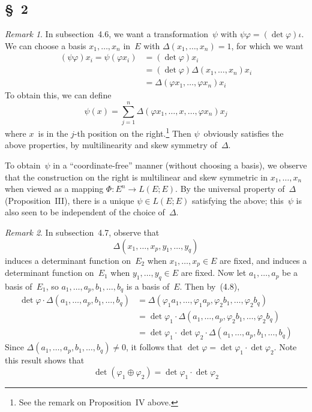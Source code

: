 \documentclass[letterpaper,12pt]{article}
\newcommand{\dsum}{\oplus}
\newcommand{\mult}{\cdot}
\theoremstyle{definition}
\theoremstyle{remark}
\newtheorem*{rmk}{Remark}
\begin{document}
\subsection*{\S~2}
\begin{rmk}
In subsection~4.6, we want a transformation~\(\psi\) with \(\psi\varphi=(\det\varphi)\iota\). We can choose a basis \(x_1,\ldots,x_n\) in~\(E\) with \(\Delta(x_1,\ldots,x_n)=1\), for which we want
\begin{align*}
(\psi\varphi)x_i=\psi(\varphi x_i)&=(\det\varphi)x_i\\
	&=(\det\varphi)\Delta(x_1,\ldots,x_n)x_i\\
	&=\Delta(\varphi x_1,\ldots,\varphi x_n)x_i
\end{align*}
To obtain this, we can define
\[\psi(x)=\sum_{j=1}^n\Delta(\varphi x_1,\ldots,x,\ldots,\varphi x_n)x_j\]
where \(x\)~is in the \(j\)-th position on the right.\footnote{See the remark on Proposition~IV above.} Then \(\psi\)~obviously satisfies the above properties, by multilinearity and skew symmetry of~\(\Delta\).

To obtain~\(\psi\) in a ``coordinate-free''  manner (without choosing a basis), we observe that the construction on the right is multilinear and skew symmetric in \(x_1,\ldots,x_n\) when viewed as a mapping \(\Phi:E^n\to L(E;E)\). By the universal property of~\(\Delta\) (Proposition~III), there is a unique \(\psi\in L(E;E)\) satisfying the above; this~\(\psi\) is also seen to be independent of the choice of~\(\Delta\).
\end{rmk}

\begin{rmk}
In subsection~4.7, observe that
\[\Delta(x_1,\ldots,x_p,y_1,\ldots,y_q)\]
induces a determinant function on~\(E_2\) when \(x_1,\ldots,x_p\in E\) are fixed, and induces a determinant function on~\(E_1\) when \(y_1,\ldots,y_q\in E\) are fixed. Now let \(a_1,\ldots,a_p\) be a basis of~\(E_1\), so \(a_1,\ldots,a_p,b_1,\ldots,b_q\) is a basis of~\(E\). Then by~(4.8),
\begin{align*}
\det\varphi\mult\Delta(a_1,\ldots,a_p,b_1,\ldots,b_q)&=\Delta(\varphi_1 a_1,\ldots,\varphi_1 a_p,\varphi_2 b_1,\ldots,\varphi_2 b_q)\\
	&=\det\varphi_1\mult\Delta(a_1,\ldots,a_p,\varphi_2 b_1,\ldots,\varphi_2 b_q)\\
	&=\det\varphi_1\mult\det\varphi_2\mult\Delta(a_1,\ldots,a_p,b_1,\ldots,b_q)
\end{align*}
Since \(\Delta(a_1,\ldots,a_p,b_1,\ldots,b_q)\ne0\), it follows that \(\det\varphi=\det\varphi_1\mult\det\varphi_2\). Note this result shows that
\[\det(\varphi_1\dsum\varphi_2)=\det\varphi_1\mult\det\varphi_2\]
\end{rmk}
\end{document}
